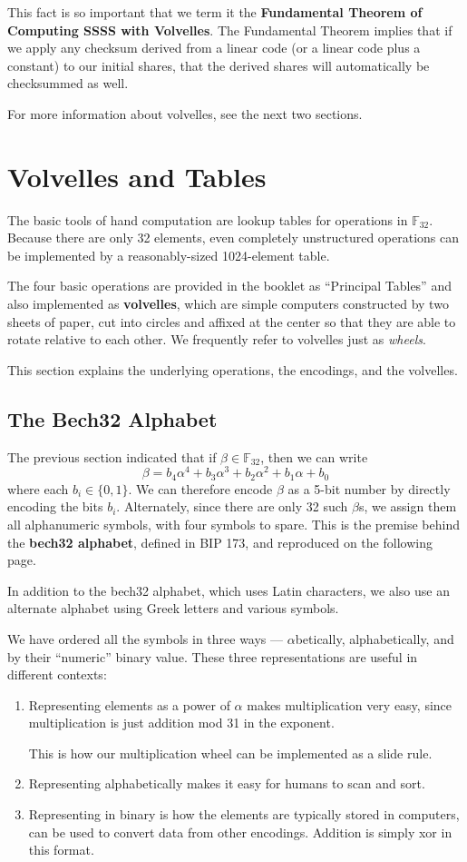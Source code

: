 \documentclass[letterpaper]{article}
\newcommand{\fttwo}{\mathbb{F}_{32}}
\begin{document}
This fact is so important that we term it the \textbf{Fundamental Theorem of
Computing SSSS with Volvelles}. The Fundamental Theorem implies that if we
apply any checksum derived from a linear code (or a linear code plus a
constant) to our initial shares, that the derived shares will automatically
be checksummed as well.

For more information about volvelles, see the next two sections.

\section{Volvelles and Tables}

The basic tools of hand computation are lookup tables for operations in $\fttwo$.
Because there are only 32 elements, even completely unstructured operations can
be implemented by a reasonably-sized 1024-element table.

The four basic operations are provided in the booklet as ``Principal Tables''
and also implemented as \textbf{volvelles}, which are simple computers constructed
by two sheets of paper, cut into circles and affixed at the center so that they
are able to rotate relative to each other. We frequently refer to volvelles just
as \emph{wheels}.

This section explains the underlying operations, the encodings, and the volvelles.

\subsection{The Bech32 Alphabet}

The previous section indicated that if $\beta\in\fttwo$, then we can write
\[ \beta = b_4\alpha^4 + b_3\alpha^3 + b_2\alpha^2 + b_1\alpha + b_0 \]
where each $b_i\in\{0, 1\}$. We can therefore encode $\beta$ as a 5-bit
number by directly encoding the bits $b_i$. Alternately, since there are
only 32 such $\beta$s, we assign them all alphanumeric symbols, with four
symbols to spare. This is the premise behind the \textbf{bech32 alphabet},
defined in BIP 173, and reproduced on the following page.

In addition to the bech32 alphabet, which uses Latin characters, we also use
an alternate alphabet using Greek letters and various symbols.

We have ordered all the symbols in three ways --- $\alpha$betically,
alphabetically, and by their ``numeric'' binary value. These three
representations are useful in different contexts:
\begin{enumerate}
\item Representing elements as a power of $\alpha$ makes multiplication
very easy, since multiplication is just addition mod 31 in the exponent.

This is how our multiplication wheel can be implemented as a slide rule.
\item Representing alphabetically makes it easy for humans to scan and sort.
\item Representing in binary is how the elements are typically stored in
computers, can be used to convert data from other encodings. Addition is
simply xor in this format.
\end{enumerate}
\end{document}
